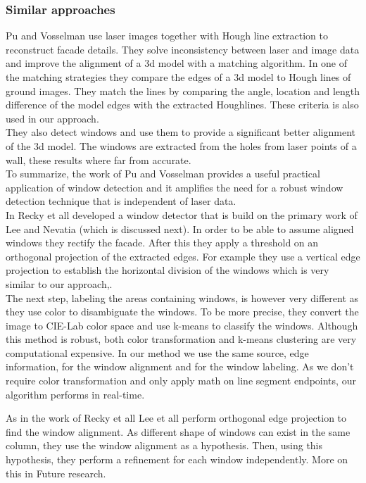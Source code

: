 \subsubsection{Similar approaches}
Pu and Vosselman \cite{Pu_refiningbuilding}
use laser images together with Hough line extraction to reconstruct facade details.  They solve inconsistency between laser and image data and improve the alignment of a 3d model with a matching algorithm.  In one of the matching strategies they compare the edges of a 3d model to Hough lines of ground images.
They match the lines by comparing the angle, location and length difference of the model edges with the extracted Houghlines.  These criteria is also used in our approach.\\
They also detect windows and use them to provide a significant better alignment of the 3d model.
The windows are extracted from the holes from laser points of a wall, these results where far from accurate.\\
To summarize, the work of Pu and Vosselman provides a useful practical application of window detection and it amplifies the need for a robust window detection technique that is independent of laser data.\\


In \cite{Recky_kmeans} Recky et all developed a window detector that is build on
the primary work of Lee and Nevatia \cite{Lee_extraction} (which is discussed
next).
In order to be able to assume aligned windows they rectify the facade.  After this they apply a threshold on an orthogonal projection of the extracted edges. 
For example they use a vertical edge projection to establish the horizontal division of the windows which is very similar to our approach,.\\
The next step, labeling the areas containing windows, is however very different as they use color to disambiguate the windows.
To be more precise, they convert the image to CIE-Lab color space and use k-means to classify the windows.
Although this method is robust, both color transformation and k-means clustering are very computational expensive.
In our method we use the same source, edge information, for the window alignment and for the window labeling.
As we don't require color transformation and only apply math on line segment
endpoints, our algorithm performs in real-time.

As in the work of Recky et all \cite{Recky_kmeans} Lee et all
\cite{Lee_extraction}
perform orthogonal edge projection to find the window alignment.  As different
shape of windows can exist in the same column, they use the window alignment as
a hypothesis.  Then, using this hypothesis, they perform a refinement for each
window independently. More on this in Future research.

